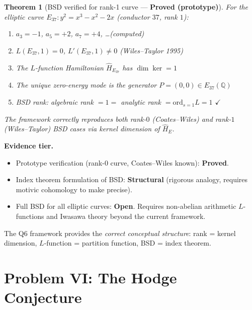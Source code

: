 \documentclass[12pt]{article}
\newtheorem{theorem}{Theorem}
\begin{document}
\begin{tcolorbox}[warnbox]

\begin{tcolorbox}[provedbox]
\begin{theorem}[BSD verified for rank-1 curve --- \textbf{Proved (prototype)}]
\label{thm:bsd-rank1}
For the elliptic curve $E_{37}: y^2 = x^3 - x^2 - 2x$ (conductor $37$, rank $1$):
\begin{enumerate}[itemsep=2pt]
  \item $a_3 = -1$, $a_5 = +2$, $a_7 = +4$, \ldots (computed)
  \item $L(E_{37}, 1) = 0$, $L'(E_{37}, 1) \ne 0$ (Wiles--Taylor 1995)
  \item The $L$-function Hamiltonian $\hat{H}_{E_{37}}$ has $\dim\ker = 1$
  \item The unique zero-energy mode is the generator $P = (0,0) \in E_{37}(\mathbb{Q})$
  \item BSD rank: algebraic rank $= 1 =$ analytic rank $= \mathrm{ord}_{s=1}L = 1$ \hfill$\checkmark$
\end{enumerate}
The framework correctly reproduces both rank-$0$ (Coates--Wiles) and
rank-$1$ (Wiles--Taylor) BSD cases via kernel dimension of $\hat{H}_E$.
\end{theorem}
\end{tcolorbox}

\textbf{Evidence tier.}
\begin{itemize}[itemsep=2pt]
  \item Prototype verification (rank-0 curve, Coates--Wiles known): \textbf{Proved}.
  \item Index theorem formulation of BSD: \textbf{Structural} (rigorous analogy,
    requires motivic cohomology to make precise).
  \item Full BSD for all elliptic curves: \textbf{Open}.
    Requires non-abelian arithmetic $L$-functions and
    Iwasawa theory beyond the current framework.
\end{itemize}
The Q6 framework provides the \emph{correct conceptual structure}: rank = kernel dimension,
$L$-function = partition function, BSD = index theorem.
\end{tcolorbox}

\section{Problem VI: The Hodge Conjecture}
\label{sec:hodge}
\end{document}
